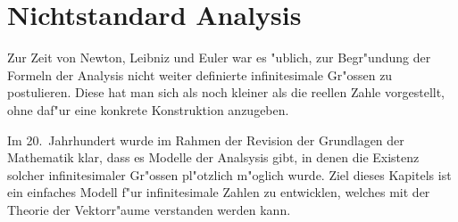%
%
\chapter{Nichtstandard Analysis}
Zur Zeit von Newton, Leibniz und Euler war es "ublich, zur Begr"undung der
Formeln der Analysis nicht weiter definierte infinitesimale Gr"ossen
zu postulieren.
Diese hat man sich als noch kleiner als die reellen Zahle vorgestellt,
ohne daf"ur eine konkrete Konstruktion anzugeben.

Im 20.~Jahrhundert wurde im Rahmen der Revision der Grundlagen der Mathematik
klar, dass es Modelle der Analsysis gibt, in denen die Existenz solcher
infinitesimaler Gr"ossen pl"otzlich m"oglich wurde.
Ziel dieses Kapitels ist ein einfaches Modell f"ur infinitesimale 
Zahlen zu entwicklen, welches mit der Theorie der Vektorr"aume
verstanden werden kann.








